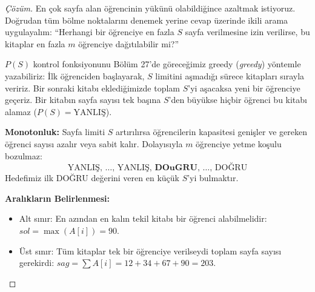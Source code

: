 \begin{proof}[Çözüm]
En çok sayfa alan öğrencinin yükünü olabildiğince azaltmak istiyoruz. Doğrudan tüm bölme noktalarını denemek yerine cevap üzerinde ikili arama uygulayalım:
``Herhangi bir öğrenciye en fazla $S$ sayfa verilmesine izin verilirse, bu kitaplar en fazla $m$ öğrenciye dağıtılabilir mi?''

$P(S)$ kontrol fonksiyonunu Bölüm 27'de göreceğimiz greedy (\emph{greedy}) yöntemle yazabiliriz:
İlk öğrenciden başlayarak, $S$ limitini aşmadığı sürece kitapları sırayla veririz. Bir sonraki kitabı eklediğimizde toplam $S$'yi aşacaksa yeni bir öğrenciye geçeriz. Bir kitabın sayfa sayısı tek başına $S$'den büyükse hiçbir öğrenci bu kitabı alamaz ($P(S) = \text{YANLIŞ}$).

\textbf{Monotonluk:}
Sayfa limiti $S$ artırılırsa öğrencilerin kapasitesi genişler ve gereken öğrenci sayısı azalır veya sabit kalır. Dolayısıyla $m$ öğrenciye yetme koşulu bozulmaz:
\[ \text{YANLIŞ}, \, \dots, \, \text{YANLIŞ}, \, \mathbf{DOu{G}RU}, \, \dots, \, \text{DOĞRU} \]
Hedefimiz ilk DOĞRU değerini veren en küçük $S$'yi bulmaktır.

\textbf{Aralıkların Belirlenmesi:}
\begin{itemize}
    \item Alt sınır: En azından en kalın tekil kitabı bir öğrenci alabilmelidir: $sol = \max(A[i]) = 90$.
    \item Üst sınır: Tüm kitaplar tek bir öğrenciye verilseydi toplam sayfa sayısı gerekirdi: $sag = \sum A[i] = 12 + 34 + 67 + 90 = 203$.
\end{itemize}


\end{proof}

